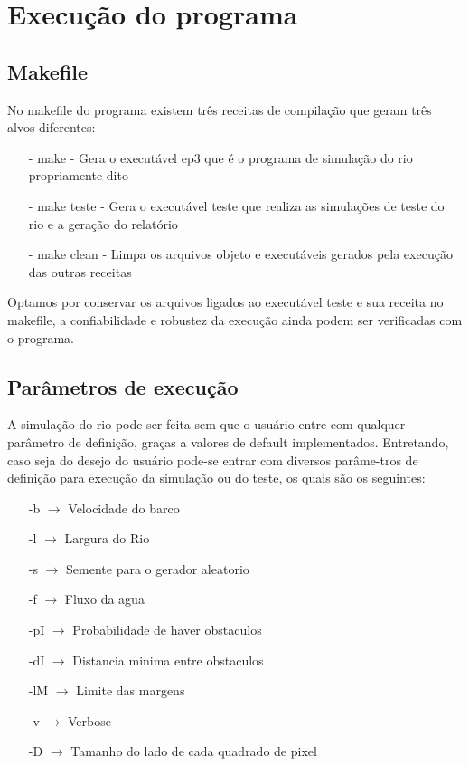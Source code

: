 \documentclass[a4paper,11pt]{article}
\begin{document}
\section{Execu\c{c}ão do programa}
\subsection{Makefile}
No makefile do programa existem três receitas de compila\c{c}ão que geram três alvos diferentes:
\begin{enumerate}
\item[-]{make - Gera o executável ep3 que é o programa de simula\c{c}ão do rio propriamente dito}
\item[-]{make teste - Gera o executável teste que realiza as simula\c{c}ões de teste do rio e a gera\c{c}ão do relatório}
\item[-]{make clean - Limpa os arquivos objeto e executáveis gerados pela execu\c{c}ão das outras receitas}
\end{enumerate}
Optamos por conservar os arquivos ligados ao executável teste e sua receita no makefile, a confiabilidade e robustez da execução ainda podem ser verificadas com o programa.
\subsection{Parâmetros de execu\c{c}ão}
A simula\c{c}ão do rio pode ser feita sem que o usuário entre com qualquer parâmetro de defini\c{c}ão, gra\c{c}as a valores de default implementados. Entretando, caso seja do desejo do usuário pode-se entrar com diversos parâme-tros de defini\c{c}ão para execu\c{c}ão da simula\c{c}ão ou do teste, os quais são os seguintes:
\begin{enumerate}
\item[]{-b  $\rightarrow$ Velocidade do barco}
\item[]{-l  $\rightarrow$ Largura do Rio}
\item[]{-s  $\rightarrow$ Semente para o gerador aleatorio}
\item[]{-f  $\rightarrow$ Fluxo da agua}
\item[]{-pI $\rightarrow$ Probabilidade de haver obstaculos}
\item[]{-dI $\rightarrow$ Distancia minima entre obstaculos}
\item[]{-lM $\rightarrow$ Limite das margens}
\item[]{-v  $\rightarrow$ Verbose}
\item[]{-D  $\rightarrow$ Tamanho do lado de cada quadrado de pixel}
\end{enumerate} 
\end{document}
